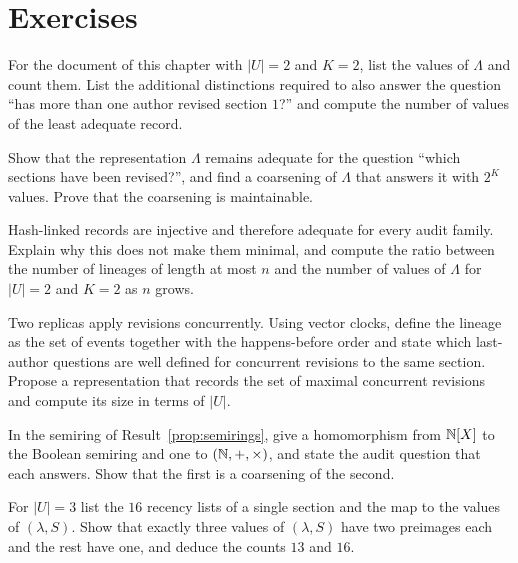 \section*{Exercises}

\begin{exercise}
For the document of this chapter with $|U|=2$ and $K=2$, list the values of $\Lambda$ and count them. List the additional distinctions required to also answer the question ``has more than one author revised section $1$?'' and compute the number of values of the least adequate record.
\end{exercise}

\begin{exercise}
Show that the representation $\Lambda$ remains adequate for the question ``which sections have been revised?'', and find a coarsening of $\Lambda$ that answers it with $2^{K}$ values. Prove that the coarsening is maintainable.
\end{exercise}

\begin{exercise}
Hash-linked records are injective and therefore adequate for every audit family. Explain why this does not make them minimal, and compute the ratio between the number of lineages of length at most $n$ and the number of values of $\Lambda$ for $|U|=2$ and $K=2$ as $n$ grows.
\end{exercise}

\begin{exercise}
Two replicas apply revisions concurrently. Using vector clocks, define the lineage as the set of events together with the happens-before order and state which last-author questions are well defined for concurrent revisions to the same section. Propose a representation that records the set of maximal concurrent revisions and compute its size in terms of $|U|$.
\end{exercise}

\begin{exercise}
In the semiring of Result~\ref{prop:semirings}, give a homomorphism from $\mathbb{N}[X]$ to the Boolean semiring and one to $(\mathbb{N},+,\times)$, and state the audit question that each answers. Show that the first is a coarsening of the second.
\end{exercise}


\begin{exercise}
For $|U|=3$ list the $16$ recency lists of a single section and the map to the values of $(\lambda,S)$. Show that exactly three values of $(\lambda,S)$ have two preimages each and the rest have one, and deduce the counts $13$ and $16$.\label{ex:recency16}
\end{exercise}

